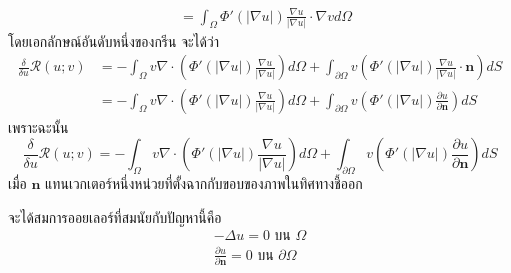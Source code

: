 \begin{Example}
\begin{align*}
    &= \int_{\Omega}\Phi'(|\nabla u|) \frac{\nabla u}{|\nabla u|} \cdot \nabla v d\Omega
    \end{align*}
    โดยเอกลักษณ์อันดับหนึ่งของกรีน จะได้ว่า
    \begin{align*}
    \frac{\delta}{\delta u}\mathcal{R}(u;v) &= - \int_{\Omega}^{} v \nabla \cdot \left(\Phi'(|\nabla u|) \frac{\nabla u}{|\nabla u|} \right)d\Omega + \int_{\partial \Omega}^{} v \left(\Phi'(|\nabla u|) \frac{\nabla u}{|\nabla u|} \cdot \boldsymbol{n}\right) dS \\
    &= -\int_{\Omega}^{} v \nabla \cdot \left(\Phi'(|\nabla u|) \frac{\nabla u}{|\nabla u|} \right)d\Omega + \int_{\partial \Omega}^{} v \left(\Phi'(|\nabla u|)  \frac{\partial u}{\partial \boldsymbol{n}}\right) dS
    \end{align*}
    เพราะฉะนั้น  
    \[
    \frac{\delta}{\delta u}\mathcal{R}(u;v) = -\int_{\Omega}^{} v \nabla \cdot \left(\Phi'(|\nabla u|) \frac{\nabla u}{|\nabla u|} \right)d\Omega + \int_{\partial \Omega}^{} v \left(\Phi'(|\nabla u|)  \frac{\partial u}{\partial \boldsymbol{n}}\right) dS
    \]
    เมื่อ $  \boldsymbol{n} $ แทนเวกเตอร์หนึ่งหน่วยที่ตั้งฉากกับขอบของภาพในทิศทางชี้ออก

    จะได้สมการออยเลอร์ที่สมนัยกับปัญหานี้คือ
    \begin{align*}
        - \Delta u = 0 \text{ บน } \Omega \\
        \frac{ \partial  u }{ \partial \boldsymbol{n}} = 0 \text{ บน } \partial \Omega
    \end{align*}
\end{Example}